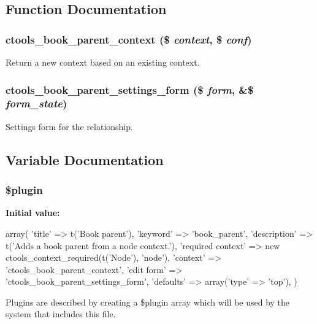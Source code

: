\subsection{Function Documentation}
\hypertarget{book__parent_8inc_aafe432d7265404f9b92bf1d944f89c07}{
\subsubsection[{ctools\_\-book\_\-parent\_\-context}]{\setlength{\rightskip}{0pt plus 5cm}ctools\_\-book\_\-parent\_\-context (\$ {\em context}, \/  \$ {\em conf})}}
\label{book__parent_8inc_aafe432d7265404f9b92bf1d944f89c07}
Return a new context based on an existing context. \hypertarget{book__parent_8inc_a493e0b362b43e7e8f47809e9c865077d}{
\subsubsection[{ctools\_\-book\_\-parent\_\-settings\_\-form}]{\setlength{\rightskip}{0pt plus 5cm}ctools\_\-book\_\-parent\_\-settings\_\-form (\$ {\em form}, \/  \&\$ {\em form\_\-state})}}
\label{book__parent_8inc_a493e0b362b43e7e8f47809e9c865077d}
Settings form for the relationship. 

\subsection{Variable Documentation}
\hypertarget{book__parent_8inc_ada8a7130088351710bb02ed622d6bf65}{
\subsubsection[{\$plugin}]{\setlength{\rightskip}{0pt plus 5cm}\$plugin}}
\label{book__parent_8inc_ada8a7130088351710bb02ed622d6bf65}
{\bfseries Initial value:}
\begin{DoxyCode}
 array(
  'title' => t('Book parent'),
  'keyword' => 'book_parent',
  'description' => t('Adds a book parent from a node context.'),
  'required context' => new ctools_context_required(t('Node'), 'node'),
  'context' => 'ctools_book_parent_context',
  'edit form' => 'ctools_book_parent_settings_form',
  'defaults' => array('type' => 'top'),
)
\end{DoxyCode}
Plugins are described by creating a \$plugin array which will be used by the system that includes this file. 